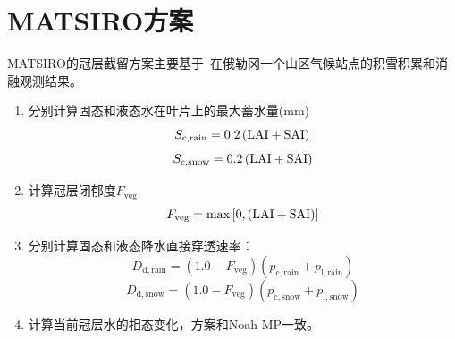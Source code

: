 \section{MATSIRO方案}
MATSIRO的冠层截留方案主要基于~\cite{storck2002measurement}在俄勒冈一个山区气候站点的积雪积累和消融观测结果。
\begin{enumerate}
  \item 分别计算固态和液态水在叶片上的最大蓄水量(mm)
    \begin{equation}
      S_{\mathrm{c,rain}}=0.2\left({\rm LAI}+{\rm SAI}\right)
    \end{equation}
    \begin{equation}
      S_{\mathrm{c,snow}}=0.2\left({\rm LAI}+{\rm SAI}\right)
    \end{equation}

  \item 计算冠层闭郁度$F_{\mathrm{veg}}$
    \begin{equation}
      F_{\mathrm{veg}} = \max\left[0, \left({\rm LAI}+{\rm SAI}\right)\right]
    \end{equation}

  \item 分别计算固态和液态降水直接穿透速率：
    \begin{equation}
      D_{\mathrm{d,rain}}=\left(1.0-F_{\mathrm{veg}}\right)  (p_{\mathrm{c,rain}}+p_{\mathrm{l,rain}})
    \end{equation}
    \begin{equation}
      D_{\mathrm{d,snow}}=\left(1.0-F_{\mathrm{veg}}\right)  (p_{\mathrm{c,snow}}+p_{\mathrm{l,snow}})
    \end{equation}
  \item 计算当前冠层水的相态变化，方案和Noah-MP一致。


\end{enumerate}
